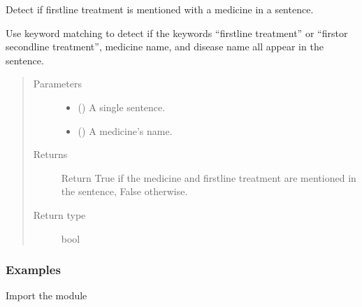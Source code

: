 \documentclass[letterpaper,10pt,english]{sphinxmanual}
\begin{document}

\begin{fulllineitems}
\label{\detokenize{biomarker_extraction:biomarker_extraction.is_firstline}}
\sphinxAtStartPar
Detect if first\sphinxhyphen{}line treatment is mentioned with a medicine in a sentence.

\sphinxAtStartPar
Use keyword matching to detect if the keywords “first\sphinxhyphen{}line treatment” or “first\sphinxhyphen{}or second\sphinxhyphen{}line treatment”, medicine name, and disease name all appear in the sentence.
\begin{quote}\begin{description}
\item[{Parameters}] \leavevmode\begin{itemize}
\item {} 
\sphinxAtStartPar
{} () \textendash{} A single sentence.

\item {} 
\sphinxAtStartPar
{} () \textendash{} A medicine’s name.

\end{itemize}

\item[{Returns}] \leavevmode
\sphinxAtStartPar
Return True if the medicine and first\sphinxhyphen{}line treatment are mentioned in the sentence, False otherwise.

\item[{Return type}] \leavevmode
\sphinxAtStartPar
bool

\end{description}\end{quote}
\subsubsection*{Examples}

\sphinxAtStartPar
Import the module

\begin{sphinxVerbatim}[commandchars=\\\{\}]
   
\end{sphinxVerbatim}


\end{fulllineitems}
\end{document}
